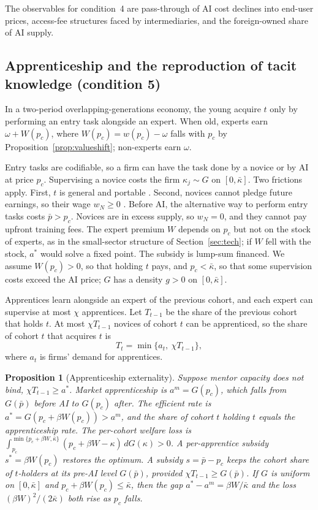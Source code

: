\documentclass[12pt]{article}
\newtheorem{proposition}{Proposition}
\theoremstyle{remark}
\begin{document}
The observables for condition~4 are pass-through of AI cost declines into end-user prices, access-fee structures faced by intermediaries, and the foreign-owned share of AI supply.

\subsection{Apprenticeship and the reproduction of tacit knowledge (condition 5)}\label{sec:apprentice}

In a two-period overlapping-generations economy, the young acquire $t$ only by performing an entry task alongside an expert. When old, experts earn $\omega+W(p_c)$, where $W(p_c)=w(p_c)-\omega$ falls with $p_c$ by Proposition~\ref{prop:valueshift}; non-experts earn $\omega$.

Entry tasks are codifiable, so a firm can have the task done by a novice or by AI at price $p_c$. Supervising a novice costs the firm $\kappa_j\sim G$ on $[0,\bar\kappa]$. Two frictions apply. First, $t$ is general and portable \citep{becker1962investment}. Second, novices cannot pledge future earnings, so their wage $w_N\ge0$ \citep{ide2025automation}. Before AI, the alternative way to perform entry tasks costs $\bar p>p_c$. Novices are in excess supply, so $w_N=0$, and they cannot pay upfront training fees. The expert premium $W$ depends on $p_c$ but not on the stock of experts, as in the small-sector structure of Section~\ref{sec:tech}; if $W$ fell with the stock, $a^*$ would solve a fixed point. The subsidy is lump-sum financed. We assume $W(p_c)>0$, so that holding $t$ pays, and $p_c<\bar\kappa$, so that some supervision costs exceed the AI price; $G$ has a density $g>0$ on $[0,\bar\kappa]$.

Apprentices learn alongside an expert of the previous cohort, and each expert can supervise at most $\chi$ apprentices. Let $T_{t-1}$ be the share of the previous cohort that holds $t$. At most $\chi T_{t-1}$ novices of cohort $t$ can be apprenticed, so the share of cohort $t$ that acquires $t$ is
\begin{equation}\label{eq:capacity}
T_t=\min\{a_t,\ \chi T_{t-1}\},
\end{equation}
where $a_t$ is firms' demand for apprentices.

\begin{proposition}[Apprenticeship externality]\label{prop:apprentice}
Suppose mentor capacity does not bind, $\chi T_{t-1}\ge a^*$. Market apprenticeship is $a^m=G(p_c)$, which falls from $G(\bar p)$ before AI to $G(p_c)$ after. The efficient rate is $a^*=G(p_c+\beta W(p_c))>a^m$, and the share of cohort $t$ holding $t$ equals the apprenticeship rate. The per-cohort welfare loss is $\int_{p_c}^{\min\{p_c+\beta W,\bar\kappa\}}(p_c+\beta W-\kappa)\,dG(\kappa)>0$. A per-apprentice subsidy $s^*=\beta W(p_c)$ restores the optimum. A subsidy $s=\bar p-p_c$ keeps the cohort share of $t$-holders at its pre-AI level $G(\bar p)$, provided $\chi T_{t-1}\ge G(\bar p)$. If $G$ is uniform on $[0,\bar\kappa]$ and $p_c+\beta W(p_c)\le\bar\kappa$, then the gap $a^*-a^m=\beta W/\bar\kappa$ and the loss $(\beta W)^2/(2\bar\kappa)$ both rise as $p_c$ falls.
\end{proposition}
\end{document}
